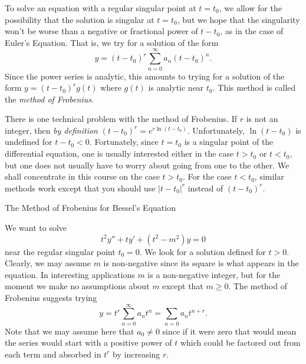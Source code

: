 To solve an equation with a regular singular point at $t = t_0$, we allow
for the possibility that the solution is singular at $t = t_0$,
but we hope that the singularity won't be worse than a negative or
fractional power of $t - t_0$, as in the case of Euler's Equation.
 That is, we try for a solution of the
form
$$
  y = (t - t_0)^r\sum_{n=0}^\infty a_n(t -t_0)^n.
$$
Since the power series is analytic, this amounts to trying
for a solution of the form  $y = (t - t_0)^r g(t)$ where $g(t)$
is analytic near $t_0$.   This method is called the
{\it method of Frobenius}.
%
%

There is one technical problem with the method of Frobenius.
If $r$ is not an integer, then {\it by definition\/}
$(t - t_0)^r = e^{r\ln(t - t_0)}$.  Unfortunately,
$\ln(t - t_0)$ is undefined for $t - t_0 < 0$.  Fortunately,
since $t = t_0$ is a singular point of the differential equation,
one is usually interested either in the case $t > t_0$ or
$t < t_0$, but one does not usually have to worry about going
from one to the other.   We shall concentrate in this course
on the case $t > t_0$.   For the case $t < t_0$, similar
methods work except that you should use $|t - t_0|^r$ instead
of $(t - t_0)^r$.

\subhead The Method of Frobenius for Bessel's Equation \endsubhead

We want to solve
$$
t^2 y'' + t y' + (t^2 - m^2) y = 0
$$
%
near the regular singular point $t_0 = 0$.  We look for a 
solution defined for $t > 0$.  Clearly, we may assume
$m$ is non-negative since its square is what appears in the equation.
In interesting applications
$m$ is a non-negative integer, but for the moment we make no
assumptions about $m$ except that $m \ge 0$.  
 The method of Frobenius suggests
trying
$$
y = t^r\sum_{n=0}^\infty a_nt^n = \sum_{n=0}a_nt^{n+r}.
$$
Note that we may assume here that $a_0 \not = 0$ since if
it were zero that would mean the series would start with
a positive power of $t$ which could be factored out from each
term and absorbed in $t^r$ by increasing $r$.

